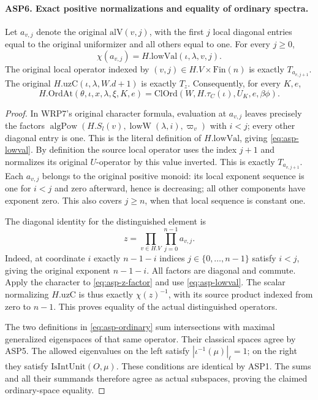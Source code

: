 \paragraph{ASP6. Exact positive normalizations and equality of ordinary spectra.}
\label{claim:ASP6}
Let $a_{v,j}$ denote the original $\mathrm{alV}(v,j)$,
with the first $j$ local diagonal entries equal to
the original uniformizer and all others equal to
one.  For every $j\geq0$,
\begin{equation}\label{eq:asp-lowval}
                  \chi(a_{v,j})=H.\mathrm{lowVal}(\iota,\lambda,v,j).
\end{equation}
The original local operator indexed by
$(v,j)\in H.V\times\mathrm{Fin}(n)$ is exactly
$T_{a_{v,j+1}}$.  The original
$H.\mathrm{uzC}(\iota,\lambda,W.d+1)$ is exactly $T_z$.
Consequently, for every $K,e$,
\begin{equation}\label{eq:asp-ordinary}
 H.\mathrm{OrdAt}(\theta,\iota,x,\lambda,\xi,K,e)
  =\mathrm{ClOrd}(W,H.\tau_C(\iota),U_K,e,\beta\phi).
\end{equation}
\begin{proof}
In WRP7's original character formula, evaluation
at $a_{v,j}$ leaves precisely the factors
$\operatorname{algPow}(H.S_l(v),
\operatorname{lowW}(\lambda,i),\varpi_v)$
with $i<j$; every other diagonal entry is one.
This is the literal definition of $H.\mathrm{lowVal}$,
giving \eqref{eq:asp-lowval}.  By definition the
source local operator uses the index $j+1$ and
normalizes its original $U$-operator by this value
inverted.  This is exactly $T_{a_{v,j+1}}$.
Each $a_{v,j}$ belongs to the original positive
monoid: its local exponent sequence is one for
$i<j$ and zero afterward, hence is decreasing;
all other components have exponent zero.  This
also covers $j\geq n$, when that local sequence
is constant one.

The diagonal identity for the distinguished element is
\begin{equation}\label{eq:asp-z-factor}
                    z=\prod_{v\in H.V}\prod_{j=0}^{n-1}a_{v,j}.
\end{equation}
Indeed, at coordinate $i$ exactly $n-1-i$ indices
$j\in\{0,\ldots,n-1\}$ satisfy $i<j$, giving
the original exponent $n-1-i$.  All factors are
diagonal and commute.  Apply the character to
\eqref{eq:asp-z-factor} and use
\eqref{eq:asp-lowval}.  The scalar normalizing
$H.\mathrm{uzC}$ is thus exactly $\chi(z)^{-1}$,
with its source product indexed from zero to
$n-1$.  This proves equality of the actual
distinguished operators.

The two definitions in \eqref{eq:asp-ordinary}
sum intersections with maximal generalized
eigenspaces of that same operator.  Their
classical spaces agree by ASP5.  The allowed
eigenvalues on the left satisfy
$|\iota^{-1}(\mu)|_\ell=1$; on the right they
satisfy $\mathrm{IsIntUnit}(O,\mu)$.
These conditions are identical by ASP1.
The sums and all their summands therefore
agree as actual subspaces, proving the claimed
ordinary-space equality.
\end{proof}

